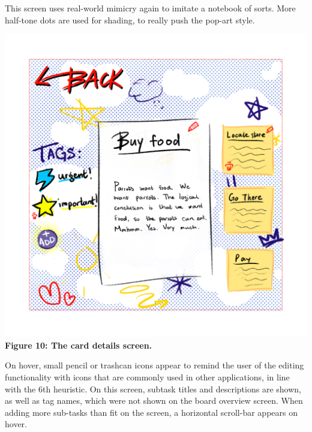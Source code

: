 This screen uses real-world mimicry again to imitate a notebook of sorts. More half-tone dots are used for shading, to really push the pop-art style.

\includegraphics[scale=0.8]{mocks/hue_mock_card_details.png}
\textbf{Figure 10: The card details screen.}
\newline

On hover, small pencil or trashcan icons appear to remind the user of the editing functionality with icons that are commonly used in other applications, in line with the 6th heuristic. On this screen, subtask titles and descriptions are shown, as well as tag names, which were not shown on the board overview screen. When adding more sub-tasks than fit on the screen, a horizontal scroll-bar appears on hover.